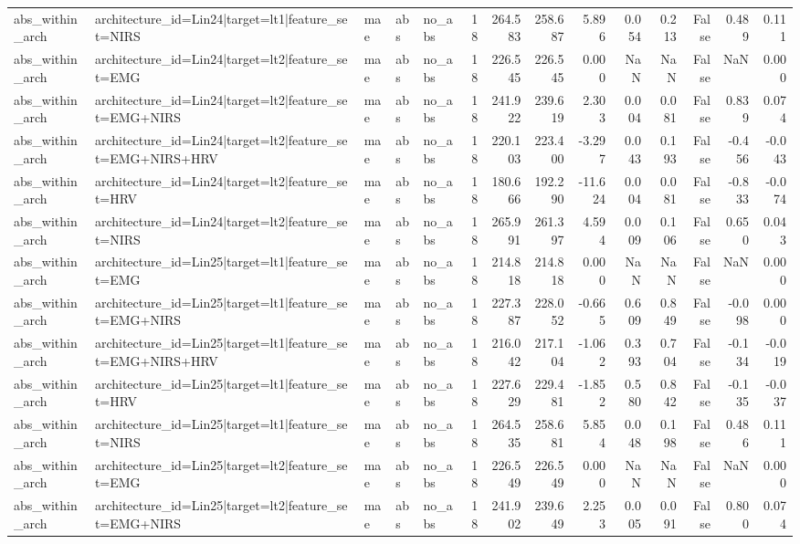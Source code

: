 \begin{table}
\begin{tabular}{lllllrrrrrrrrr}
abs_within_arch & architecture_id=Lin24|target=lt1|feature_set=NIRS & mae & abs & no_abs & 18 & 264.583 & 258.687 & 5.896 & 0.054 & 0.213 & False & 0.489 & 0.111 \\
abs_within_arch & architecture_id=Lin24|target=lt2|feature_set=EMG & mae & abs & no_abs & 18 & 226.545 & 226.545 & 0.000 & NaN & NaN & False & NaN & 0.000 \\
abs_within_arch & architecture_id=Lin24|target=lt2|feature_set=EMG+NIRS & mae & abs & no_abs & 18 & 241.922 & 239.619 & 2.303 & 0.004 & 0.081 & False & 0.839 & 0.074 \\
abs_within_arch & architecture_id=Lin24|target=lt2|feature_set=EMG+NIRS+HRV & mae & abs & no_abs & 18 & 220.103 & 223.400 & -3.297 & 0.043 & 0.193 & False & -0.456 & -0.043 \\
abs_within_arch & architecture_id=Lin24|target=lt2|feature_set=HRV & mae & abs & no_abs & 18 & 180.666 & 192.290 & -11.624 & 0.004 & 0.081 & False & -0.833 & -0.074 \\
abs_within_arch & architecture_id=Lin24|target=lt2|feature_set=NIRS & mae & abs & no_abs & 18 & 265.991 & 261.397 & 4.594 & 0.009 & 0.106 & False & 0.650 & 0.043 \\
abs_within_arch & architecture_id=Lin25|target=lt1|feature_set=EMG & mae & abs & no_abs & 18 & 214.818 & 214.818 & 0.000 & NaN & NaN & False & NaN & 0.000 \\
abs_within_arch & architecture_id=Lin25|target=lt1|feature_set=EMG+NIRS & mae & abs & no_abs & 18 & 227.387 & 228.052 & -0.665 & 0.609 & 0.849 & False & -0.098 & 0.000 \\
abs_within_arch & architecture_id=Lin25|target=lt1|feature_set=EMG+NIRS+HRV & mae & abs & no_abs & 18 & 216.042 & 217.104 & -1.062 & 0.393 & 0.704 & False & -0.134 & -0.019 \\
abs_within_arch & architecture_id=Lin25|target=lt1|feature_set=HRV & mae & abs & no_abs & 18 & 227.629 & 229.481 & -1.852 & 0.580 & 0.842 & False & -0.135 & -0.037 \\
abs_within_arch & architecture_id=Lin25|target=lt1|feature_set=NIRS & mae & abs & no_abs & 18 & 264.535 & 258.681 & 5.854 & 0.048 & 0.198 & False & 0.486 & 0.111 \\
abs_within_arch & architecture_id=Lin25|target=lt2|feature_set=EMG & mae & abs & no_abs & 18 & 226.549 & 226.549 & 0.000 & NaN & NaN & False & NaN & 0.000 \\
abs_within_arch & architecture_id=Lin25|target=lt2|feature_set=EMG+NIRS & mae & abs & no_abs & 18 & 241.902 & 239.649 & 2.253 & 0.005 & 0.091 & False & 0.800 & 0.074 \\

\end{tabular}
\end{table}
